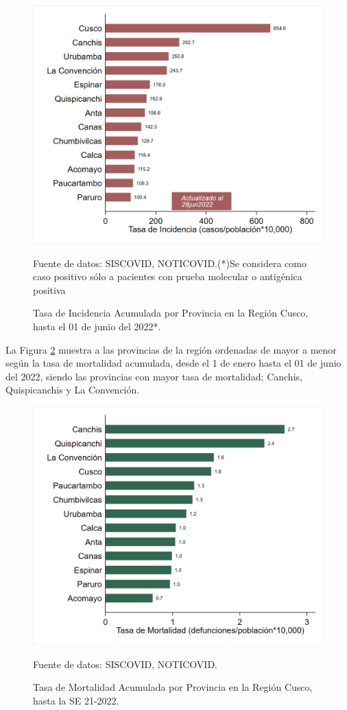 \documentclass[12pt,a4paper,openany]{book}
\begin{document}
	\begin{figure}[!htpb]
		\caption{Tasa de Incidencia Acumulada por Provincia en la Región Cusco, hasta el 01 de junio del 2022*. }\label{fig:incidencia_provincias}
		\begin{center}
			\includegraphics[width=0.60\linewidth]{../figuras/incidencia_provincial_2022.png}
		\end{center}
		{\footnotesize {
				Fuente de datos: SISCOVID, NOTICOVID.(*)Se considera como caso positivo sólo a pacientes con prueba molecular o antigénica positiva}}
	\end{figure}
	
	La Figura \ref{fig:mortalidad_ordenada} muestra a las provincias de la región ordenadas de mayor a menor según la tasa de mortalidad acumulada, desde el 1 de enero hasta el 01 de junio del 2022, siendo las provincias con mayor tasa de mortalidad;  Canchis, Quispicanchis y La Convención.  
	
	\begin{figure}[h]
		\caption{Tasa de Mortalidad Acumulada por Provincia en la Región Cusco, hasta la SE 21-2022. }\label{fig:mortalidad_ordenada}
		\begin{center}
			\includegraphics[width=0.60\linewidth]{../figuras/mortalidad_provincial_2022.png}
		\end{center}
		{\footnotesize {Fuente de datos: SISCOVID, NOTICOVID.}}
	\end{figure}
	
\end{document}

